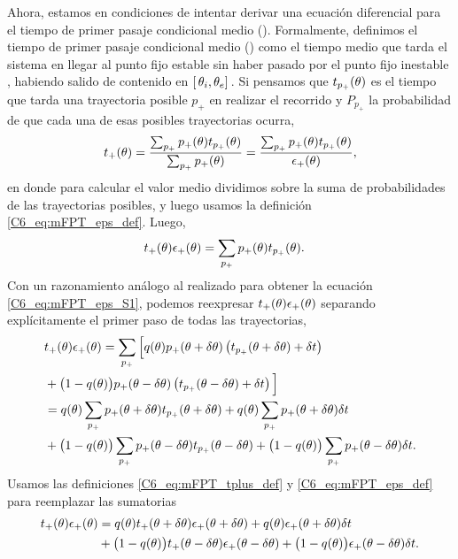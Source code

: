 \documentclass[./main.tex]{subfiles}
\begin{document}
Ahora, estamos en condiciones de intentar derivar una ecuación diferencial para el tiempo de primer pasaje condicional medio \tplus(\xx). Formalmente, definimos el tiempo de primer pasaje condicional medio \tplus(\xx) como el tiempo medio que tarda el sistema en llegar al punto fijo estable \xxe sin haber pasado por el punto fijo inestable \xxi, habiendo salido de \xx contenido en $[ \,\theta_i,\theta_e ]\,$. Si pensamos que $t_{p_{+}}(\theta)$ es el tiempo que tarda una trayectoria posible $p_{+}$ en realizar el recorrido y $P_{p_{+}}$ la probabilidad de que cada una de esas posibles trayectorias ocurra,
\begin{align}
    t_{+}(\theta) = \frac{\sum_{p_{+}}p_{+}(\theta) t_{p_{+}}(\theta)}{\sum_{p_{+}}p_{+}(\theta)} = \frac{\sum_{p_{+}}p_{+}(\theta) t_{p_{+}}(\theta)}{\epsilon_{+}(\theta)},
\end{align}
en donde para calcular el valor medio dividimos sobre la suma de probabilidades de las trayectorias posibles, y luego usamos la definición \ref{C6_eq:mFPT_eps_def}. Luego,
\begin{align}
    t_{+}(\theta) \epsilon_{+}(\theta)  &= \sum_{p_{+}}p_{+}(\theta) t_{p_{+}}(\theta).
    \label{C6_eq:mFPT_tplus_def}
\end{align}
Con un razonamiento análogo al realizado para obtener la ecuación \ref{C6_eq:mFPT_eps_S1}, podemos reexpresar $t_{+}(\theta) \epsilon_{+}(\theta)$ separando explícitamente el primer paso de todas las trayectorias,  
\begin{align}
   & t_{+}(\theta) \epsilon_{+}(\theta) = \sum_{p_{+}} \Big[ q(\theta)  p_{+}(\theta + \delta\theta ) \left( t_{p_{+}}(\theta + \delta\theta) + \delta t \right)  \nonumber \\ & + \big( 1 - q(\theta) \big)  p_{+}(\theta - \delta\theta ) \left( t_{p_{+}}(\theta - \delta\theta) + \delta t \right)\Big] \nonumber \\
   & =  q(\theta) \sum_{p_{+}} p_{+}(\theta + \delta\theta ) t_{p_{+}}(\theta + \delta\theta) + q(\theta) \sum_{p_{+}} p_{+}(\theta + \delta\theta ) \delta t  \nonumber \\ & + \big( 1 - q(\theta) \big) \sum_{p_{+}}p_{+}(\theta - \delta\theta ) t_{p_{+}}(\theta - \delta\theta) +  \big( 1 - q(\theta) \big) \sum_{p_{+}}p_{+}(\theta - \delta\theta ) \delta t .
\end{align}
Usamos las definiciones \ref{C6_eq:mFPT_tplus_def} y \ref{C6_eq:mFPT_eps_def} para reemplazar las sumatorias
\begin{align}
   t_{+}(\theta) \epsilon_{+}(\theta) & = q(\theta) t_{+}(\theta + \delta\theta) \epsilon_{+}(\theta + \delta\theta) + q(\theta) \epsilon_{+}(\theta + \delta\theta) \delta t \nonumber \\ & + \big( 1 - q(\theta) \big) t_{+}(\theta - \delta\theta) \epsilon_{+}(\theta - \delta\theta) +  \big( 1 - q(\theta) \big) \epsilon_{+}(\theta - \delta\theta) \delta t.
   \label{C6_eq:mFPT_tplus_S1}
\end{align}
\end{document}
